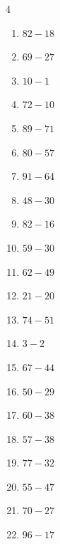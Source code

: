 \begin{multicols}{4}
\begin{enumerate}
  \item $82-18$
        \phantom{$=64$}

  \item $69-27$
        \phantom{$=42$}

  \item $10-1$
        \phantom{$=9$}

  \item $72-10$
        \phantom{$=62$}

  \item $89-71$
        \phantom{$=18$}

  \item $80-57$
        \phantom{$=23$}

  \item $91-64$
        \phantom{$=27$}

  \item $48-30$
        \phantom{$=18$}

  \item $82-16$
        \phantom{$=66$}

  \item $59-30$
        \phantom{$=29$}

  \item $62-49$
        \phantom{$=13$}

  \item $21-20$
        \phantom{$=1$}

  \item $74-51$
        \phantom{$=23$}

  \item $3-2$
        \phantom{$=1$}

  \item $67-44$
        \phantom{$=23$}

  \item $50-29$
        \phantom{$=21$}

  \item $60-38$
        \phantom{$=22$}

  \item $57-38$
        \phantom{$=19$}

  \item $77-32$
        \phantom{$=45$}

\columnbreak %

  \item $55-47$
        \phantom{$=8$}

  \item $70-27$
        \phantom{$=43$}

  \item $96-17$
        \phantom{$=79$}


\end{enumerate}
\end{multicols}
